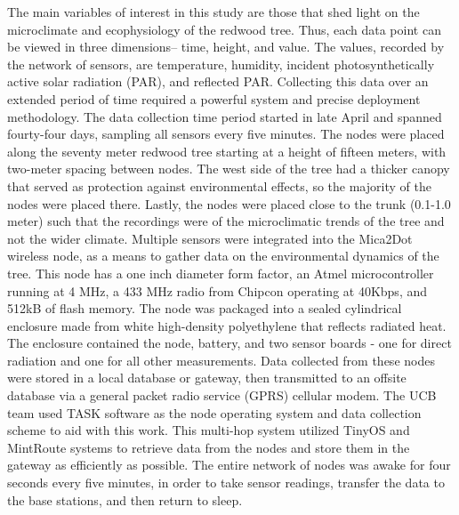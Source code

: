 \documentclass[11pt]{article}
\begin{document}
The main variables of interest in this study are those that shed light on the microclimate and ecophysiology of the redwood tree. Thus, each data point can be viewed in three dimensions-- time, height, and value. The values, recorded by the network of sensors, are temperature, humidity, incident photosynthetically active solar radiation (PAR), and reflected PAR. Collecting this data over an extended period of time required a powerful system and precise deployment methodology. The data collection time period started in late April and spanned fourty-four days, sampling all sensors every five minutes. The nodes were placed along the seventy meter redwood tree starting at a height of fifteen meters, with two-meter spacing between nodes. The west side of the tree had a thicker canopy that served as protection against environmental effects, so the majority of the nodes were placed there. Lastly, the nodes were placed close to the trunk (0.1-1.0 meter) such that the recordings were of the microclimatic trends of the tree and not the wider climate.
Multiple sensors were integrated into the Mica2Dot wireless node, as a means to gather data on the environmental dynamics of the tree. This node has a one inch diameter form factor, an Atmel microcontroller running at 4 MHz, a 433 MHz radio from Chipcon operating at 40Kbps, and 512kB of flash memory. The node was packaged into a sealed cylindrical enclosure made from white high-density polyethylene that reflects radiated heat. The enclosure contained the node, battery, and two sensor boards - one for direct radiation and one for all other measurements. Data collected from these nodes were stored in a local database or gateway, then transmitted to an offsite database via a general packet radio service (GPRS) cellular modem. The UCB team used TASK software as the node operating system and data collection scheme to aid with this work. This multi-hop system utilized TinyOS and MintRoute systems to retrieve data from the nodes and store them in the gateway as efficiently as possible. The entire network of nodes was awake for four seconds every five minutes, in order to take sensor readings, transfer the data to the base stations, and then return to sleep.
\end{document}

